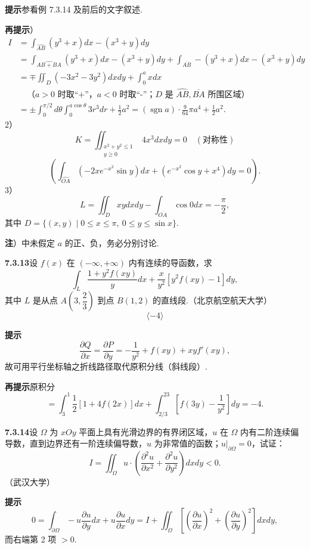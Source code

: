 \documentclass[UTF8,12pt,a4paper,fontset=fandol]{ctexart}
\begin{document}
\noindent\textbf{提示}\quad 参看例 7.3.14 及前后的文字叙述.

\noindent\textbf{再提示}）
\[
\begin{aligned}
I&=\int_{\widehat{AB}}(y^3+x)dx-(x^3+y)dy\\
&=\int_{\widehat{AB+BA}}(y^3+x)dx-(x^3+y)dy
+\int_{\overline{AB}}-(y^3+x)dx-(x^3+y)dy\\
&=\mp\iint_D(-3x^2-3y^2)dxdy+\int_0^axdx\\
&\quad\text{（}a>0\text{ 时取“+”，}a<0\text{ 时取“-”；}D\text{ 是 }\widehat{AB},\overline{BA}\text{ 所围区域）}\\
&=\pm\int_0^{\pi/2}d\theta\int_0^{a\cos\theta}3r^3dr+\frac12a^2
=(\operatorname{sgn}a)\cdot\frac9{64}\pi a^4+\frac12a^2.
\end{aligned}
\]
2）
\[
K=\iint_{\substack{x^2+y^2\le1\\y\ge0}}4x^3dxdy=0\quad(\text{对称性})
\]
\[
\left(\int_{\widehat{OA}}(-2xe^{-x^2}\sin y)dx+(e^{-x^2}\cos y+x^4)dy=0\right).
\]
3）
\[
L=\iint_Dxydxdy-\int_{\overline{OA}}\cos0dx=-\frac\pi2,
\]
其中 $D=\{(x,y)\mid0\le x\le\pi,\ 0\le y\le\sin x\}$.

\noindent\textbf{注}）中未假定 $a$ 的正、负，务必分别讨论.

\noindent\textbf{7.3.13}\quad 设 $f(x)$ 在 $(-\infty,+\infty)$ 内有连续的导函数，求
\[
\int_L\frac{1+y^2f(xy)}y dx+\frac x{y^2}[y^2f(xy)-1]dy,
\]
其中 $L$ 是从点 $A\left(3,\dfrac23\right)$ 到点 $B(1,2)$ 的直线段.（北京航空航天大学）
\[
\langle-4\rangle
\]

\noindent\textbf{提示}\quad
\[
\frac{\partial Q}{\partial x}=\frac{\partial P}{\partial y}
=-\frac1{y^2}+f(xy)+xyf'(xy),
\]
故可用平行坐标轴之折线路径取代原积分线（斜线段）.

\noindent\textbf{再提示}\quad 原积分
\[
=\int_3^1\frac12[1+4f(2x)]dx+\int_{2/3}^23\left[f(3y)-\frac1{y^2}\right]dy=-4.
\]

\noindent\textbf{7.3.14}\quad 设 $\Omega$ 为 $xOy$ 平面上具有光滑边界的有界闭区域，$u$ 在 $\Omega$ 内有二阶连续偏导数，直到边界还有一阶连续偏导数，$u$ 为非常值的函数；$u|_{\partial\Omega}=0$，试证：
\[
I=\iint_\Omega u\cdot\left(\frac{\partial^2u}{\partial x^2}
+\frac{\partial^2u}{\partial y^2}\right)dxdy<0.
\]
（武汉大学）

\noindent\textbf{提示}\quad
\[
0=\int_{\partial\Omega}-u\frac{\partial u}{\partial y}dx
+u\frac{\partial u}{\partial x}dy
=I+\iint_\Omega\left[\left(\frac{\partial u}{\partial x}\right)^2
+\left(\frac{\partial u}{\partial y}\right)^2\right]dxdy,
\]
而右端第 2 项 $>0$.
\end{document}
